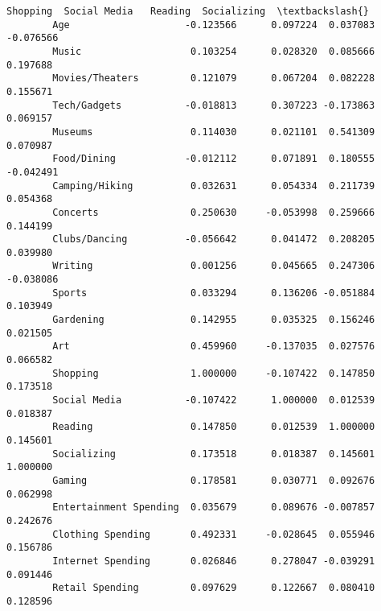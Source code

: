 \documentclass[11pt]{article}
\begin{document}
\begin{Verbatim}[commandchars=\\\{\}]
                                Shopping  Social Media   Reading  Socializing  \textbackslash{}
        Age                    -0.123566      0.097224  0.037083    -0.076566   
        Music                   0.103254      0.028320  0.085666     0.197688   
        Movies/Theaters         0.121079      0.067204  0.082228     0.155671   
        Tech/Gadgets           -0.018813      0.307223 -0.173863     0.069157   
        Museums                 0.114030      0.021101  0.541309     0.070987   
        Food/Dining            -0.012112      0.071891  0.180555    -0.042491   
        Camping/Hiking          0.032631      0.054334  0.211739     0.054368   
        Concerts                0.250630     -0.053998  0.259666     0.144199   
        Clubs/Dancing          -0.056642      0.041472  0.208205     0.039980   
        Writing                 0.001256      0.045665  0.247306    -0.038086   
        Sports                  0.033294      0.136206 -0.051884     0.103949   
        Gardening               0.142955      0.035325  0.156246     0.021505   
        Art                     0.459960     -0.137035  0.027576     0.066582   
        Shopping                1.000000     -0.107422  0.147850     0.173518   
        Social Media           -0.107422      1.000000  0.012539     0.018387   
        Reading                 0.147850      0.012539  1.000000     0.145601   
        Socializing             0.173518      0.018387  0.145601     1.000000   
        Gaming                  0.178581      0.030771  0.092676     0.062998   
        Entertainment Spending  0.035679      0.089676 -0.007857     0.242676   
        Clothing Spending       0.492331     -0.028645  0.055946     0.156786   
        Internet Spending       0.026846      0.278047 -0.039291     0.091446   
        Retail Spending         0.097629      0.122667  0.080410     0.128596   
        

\end{Verbatim}
\end{document}
